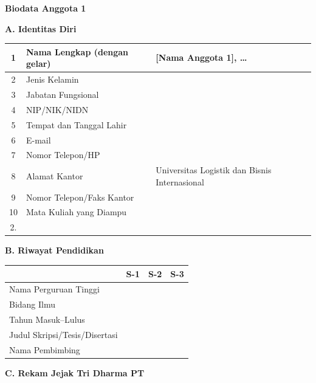 \newpage

\textbf{Biodata Anggota 1}

\textbf{A. Identitas Diri}
\begin{table}[h]
    \begin{tabularx}{\textwidth}{|c|X|X|}
        \hline
        1 & Nama Lengkap (dengan gelar) & {[Nama Anggota 1]}, \ldots \\ \hline
        2 & Jenis Kelamin & \\ \hline
        3 & Jabatan Fungsional & \\ \hline
        4 & NIP/NIK/NIDN & \\ \hline
        5 & Tempat dan Tanggal Lahir & \\ \hline
        6 & E-mail & \\ \hline
        7 & Nomor Telepon/HP & \\ \hline
        8 & Alamat Kantor & Universitas Logistik dan Bisnis Internasional \\ \hline
        9 & Nomor Telepon/Faks Kantor & \\ \hline
        10 & Mata Kuliah yang Diampu & \begin{tabular}[t]{@{}l@{}} 1. \\ 2. \end{tabular} \\ \hline
    \end{tabularx}
\end{table}

\textbf{B. Riwayat Pendidikan}
\begin{table}[h]
    \begin{tabularx}{\textwidth}{|X|X|X|X|}
        \hline
        & \textbf{S-1} & \textbf{S-2} & \textbf{S-3} \\ \hline
        Nama Perguruan Tinggi & & & \\ \hline
        Bidang Ilmu & & & \\ \hline
        Tahun Masuk--Lulus & & & \\ \hline
        Judul Skripsi/Tesis/Disertasi & & & \\ \hline
        Nama Pembimbing & & & \\ \hline
    \end{tabularx}
\end{table}

\textbf{C. Rekam Jejak Tri Dharma PT}

